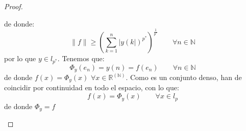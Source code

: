 \begin{prop}
\begin{proof}
\begin{itemize}
                de donde:
                \begin{equation*}
                    \|f\| \geq {\left(\sum_{k=1}^{n}{|y(k|)}^{p^\ast}\right)}^{\frac{1}{p^\ast}} \qquad \forall n\in \mathbb{N}
                \end{equation*}
                por lo que $y\in l_{p^\ast}$. Tenemos que:
                \begin{equation*}
                    \Phi_y(e_n) = y(n) = f(e_n) \qquad \forall n\in \mathbb{N}
                \end{equation*}
                de donde $f(x) = \Phi_y(x)$ $\forall x\in \mathbb{R}^{(\mathbb{N})}$. Como es un conjunto denso, han de coincidir por continuidad en todo el espacio, con lo que:
                \begin{equation*}
                    f(x) = \Phi_y(x) \qquad \forall x\in l_p
                \end{equation*}
                de donde $\Phi_y = f$
        \end{itemize}
    \end{proof}
\end{prop}






